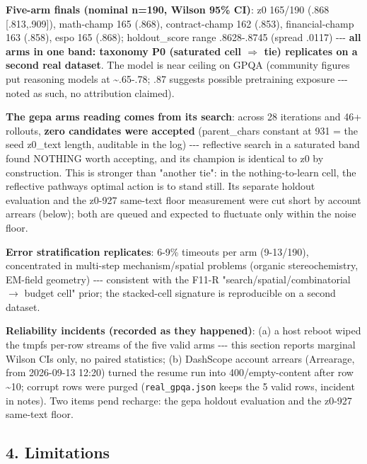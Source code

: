 \textbf{Five-arm finals (nominal n=190, Wilson 95\% CI)}: z0 165/190 (.868 {[}.813,.909{]}), math-champ 165 (.868), contract-champ 162 (.853), financial-champ 163 (.858), espo 165 (.868); holdout\_score range .8628-.8745 (spread .0117) -\/-\/- \textbf{all arms in one band: taxonomy P0 (saturated cell \(\Rightarrow\) tie) replicates on a second real dataset}. The model is near ceiling on GPQA (community figures put reasoning models at \textasciitilde.65-.78; .87 suggests possible pretraining exposure -\/-\/- noted as such, no attribution claimed).

\textbf{The gepa arm\textquotesingle s reading comes from its search}: across 28 iterations and 46+ rollouts, \textbf{zero candidates were accepted} (parent\_chars constant at 931 = the seed z0\_text length, auditable in the log) -\/-\/- reflective search in a saturated band found NOTHING worth accepting, and its champion is identical to z0 by construction. This is stronger than "another tie": in the nothing-to-learn cell, the reflective pathway\textquotesingle s optimal action is to stand still. Its separate holdout evaluation and the z0-927 same-text floor measurement were cut short by account arrears (below); both are queued and expected to fluctuate only within the noise floor.

\textbf{Error stratification replicates}: 6-9\% timeouts per arm (9-13/190), concentrated in multi-step mechanism/spatial problems (organic stereochemistry, EM-field geometry) -\/-\/- consistent with the F11-R "search/spatial/combinatorial \(\rightarrow\) budget cell" prior; the stacked-cell signature is reproducible on a second dataset.

\textbf{Reliability incidents (recorded as they happened)}: (a) a host reboot wiped the tmpfs per-row streams of the five valid arms -\/-\/- this section reports marginal Wilson CIs only, no paired statistics; (b) DashScope account arrears (Arrearage, from 2026-09-13 12:20) turned the resume run into 400/empty-content after row \textasciitilde10; corrupt rows were purged (\texttt{real\_gpqa.json} keeps the 5 valid rows, incident in notes). Two items pend recharge: the gepa holdout evaluation and the z0-927 same-text floor.

\subsection{4. Limitations}\label{4-limitations}

